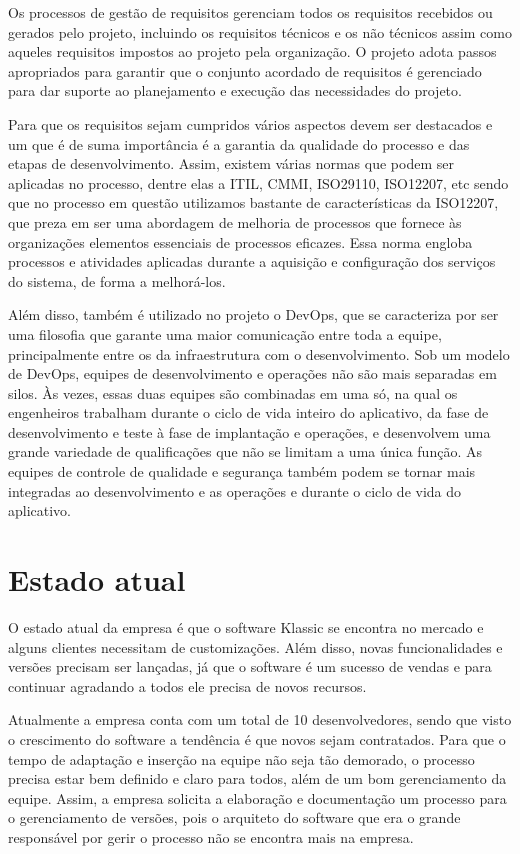 \documentclass[	DIV=calc,%
							paper=a4,%
							fontsize=12pt,%
							onecolumn]{scrartcl}	 					%
\begin{document}
Os processos de gestão de requisitos gerenciam todos os requisitos
recebidos ou gerados pelo projeto, incluindo os requisitos técnicos e os
não técnicos assim como aqueles requisitos impostos ao projeto pela
organização. O projeto adota passos apropriados para garantir que o conjunto
acordado de requisitos é gerenciado para dar suporte ao planejamento
e execução das necessidades do projeto.

Para que os requisitos sejam cumpridos vários aspectos devem ser destacados e um que é 
de suma importância é a garantia da qualidade do processo e das etapas de desenvolvimento. Assim, existem várias normas que podem ser aplicadas
no processo, dentre elas a ITIL, CMMI, ISO29110, ISO12207, etc sendo que no processo em questão utilizamos bastante de características da ISO12207, que preza em ser uma abordagem de melhoria de processos que fornece às organizações elementos essenciais de processos eficazes.  Essa norma engloba processos e atividades aplicadas durante a aquisição e configuração dos serviços do sistema, de forma a melhorá-los.

Além disso, também é utilizado no projeto o DevOps, que se caracteriza por ser uma filosofia que garante uma maior comunicação entre toda a equipe, principalmente entre os da infraestrutura com o desenvolvimento. Sob um modelo de DevOps, equipes de desenvolvimento e operações não são mais separadas em silos. Às vezes, essas duas equipes são combinadas em uma só, na qual os engenheiros trabalham durante o ciclo de vida inteiro do aplicativo, da fase de desenvolvimento e teste à fase de implantação e operações, e desenvolvem uma grande variedade de qualificações que não se limitam a uma única função. As equipes de controle de qualidade e segurança também podem se tornar mais integradas ao desenvolvimento e as operações e durante o ciclo de vida do aplicativo.

\section{Estado atual}
O estado atual da empresa é que o software Klassic se encontra no mercado e alguns clientes necessitam de customizações. Além disso, novas funcionalidades e versões precisam ser lançadas, já que o software é um sucesso de vendas e para continuar agradando a todos ele precisa 
de novos recursos.

Atualmente a empresa conta com um total de 10 desenvolvedores, sendo que visto o crescimento do software a tendência é que novos sejam contratados. Para que o tempo de adaptação e inserção na equipe não seja tão demorado, o processo precisa estar bem definido e claro para todos, além de um bom gerenciamento da equipe. Assim, a empresa solicita a elaboração e documentação um processo para o gerenciamento de versões, pois o arquiteto do software que era o grande responsável por gerir o processo não se encontra mais na empresa. 
\end{document}

